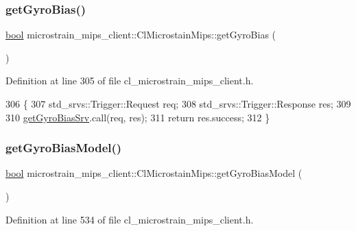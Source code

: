\subsubsection{\texorpdfstring{get\+Gyro\+Bias()}{getGyroBias()}}
{\footnotesize\ttfamily \hyperlink{classbool}{bool} microstrain\+\_\+mips\+\_\+client\+::\+Cl\+Microstain\+Mips\+::get\+Gyro\+Bias (\begin{DoxyParamCaption}{ }\end{DoxyParamCaption})\hspace{0.3cm}{\ttfamily [inline]}}



Definition at line 305 of file cl\+\_\+microstrain\+\_\+mips\+\_\+client.\+h.


\begin{DoxyCode}
306     \{
307         std\_srvs::Trigger::Request req;
308         std\_srvs::Trigger::Response res;
309 
310         \hyperlink{classmicrostrain__mips__client_1_1ClMicrostainMips_ace4f76603ac7b3179dacee7c066c120c}{getGyroBiasSrv}.call(req, res);
311         \textcolor{keywordflow}{return} res.success;
312     \}
\end{DoxyCode}
\mbox{\label{classmicrostrain__mips__client_1_1ClMicrostainMips_ab188b8307aa2beb016809873a0c55d07}} 
\subsubsection{\texorpdfstring{get\+Gyro\+Bias\+Model()}{getGyroBiasModel()}}
{\footnotesize\ttfamily \hyperlink{classbool}{bool} microstrain\+\_\+mips\+\_\+client\+::\+Cl\+Microstain\+Mips\+::get\+Gyro\+Bias\+Model (\begin{DoxyParamCaption}{ }\end{DoxyParamCaption})\hspace{0.3cm}{\ttfamily [inline]}}



Definition at line 534 of file cl\+\_\+microstrain\+\_\+mips\+\_\+client.\+h.


